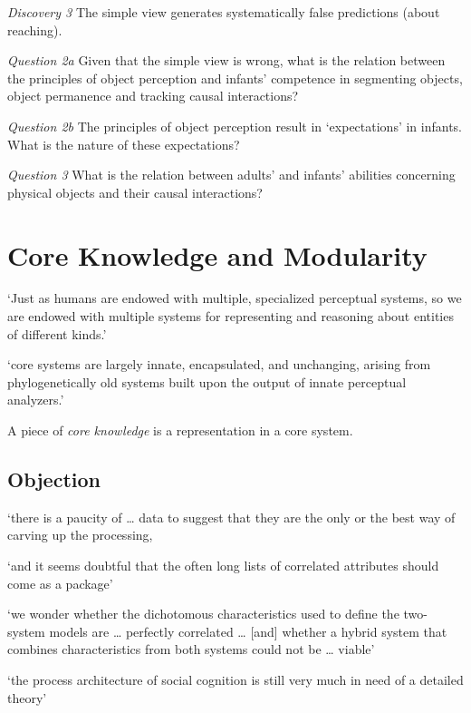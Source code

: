 \documentclass[12pt]{extarticle}
\begin{document}
\begin{multicols}{3}
\emph{Discovery 3} The simple view generates systematically false predictions (about reaching).
 
\emph{Question 2a} Given that the simple view is wrong, what is the relation between the principles of object perception and infants’ competence in segmenting objects, object permanence and tracking causal interactions?
 
\emph{Question 2b} The principles of object perception result in ‘expectations’ in infants. What is the nature of these expectations?
 
\emph{Question 3} What is the relation between adults’ and infants’ abilities concerning physical objects and their causal interactions?
 
 
 
\section{Core Knowledge and Modularity}
 
‘Just as humans are endowed with multiple, specialized perceptual systems, so we are endowed with multiple systems for representing and reasoning about entities of different kinds.’
\citep[p.\ 517]{Carey:1996hl}
 
‘core systems are largely innate, encapsulated, and unchanging, arising from phylogenetically old systems built upon the output of innate perceptual analyzers.’
\citep[p.\ 520]{Carey:1996hl}
 
A piece of \emph{core knowledge} is a representation in a core system.
 
\subsection{Objection}
 
‘there is a paucity of … data to suggest that they are the only or the best way of carving up the processing,
 
‘and it seems doubtful that the often long lists of correlated attributes should come as a package’
\citep[p.\ 759]{adolphs_conceptual_2010}
 
‘we wonder whether the dichotomous characteristics used to define the two-system models are … perfectly correlated …
[and] whether a hybrid system that combines characteristics from both systems could not be … viable’
\citep[p.\ 537]{keren_two_2009}
 
‘the process architecture of social cognition is still very much in need of a detailed theory’
\citep[p.\ 759]{adolphs_conceptual_2010}
 

\end{multicols}
\end{document}
